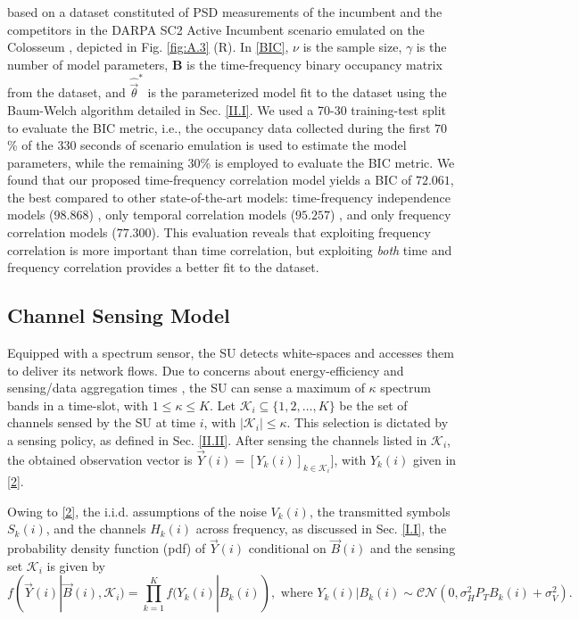 \documentclass[12pt, draftcls, onecolumn]{IEEEtran}
\begin{document}
based on a dataset constituted of PSD measurements of the incumbent and the competitors in the DARPA SC2 Active Incumbent scenario emulated on the Colosseum \cite{DARPA:SC2, DARPA:SC2c2api, DARPA:ActiveIncumbent, DARPA:SC2scenarios}, depicted in Fig. \ref{fig:A.3} (R). In \eqref{BIC}, $\nu$ is the sample size, $\gamma$ is the number of model parameters, $\mathbf{B}$ is the time-frequency binary occupancy matrix from the dataset, and $\hat{\vec{\theta}}^*$ is the parameterized model fit to the dataset using the Baum-Welch algorithm detailed in Sec. \ref{II.I}. We used a 70-30 training-test split to evaluate the BIC metric, i.e., the occupancy data collected during the first $70$\% of the $330$ seconds of scenario emulation is used to estimate the model parameters, while the remaining $30$\% is employed to evaluate the BIC metric. We found that our proposed time-frequency correlation model yields a BIC of $72.061$, the best compared to other state-of-the-art models: time-frequency independence models ($98.868$) \cite{WCL:4, WCL:10, WCL:9, WCL:11, WCL:8}, only temporal correlation models ($95.257$) \cite{WCL:5}, and only frequency correlation models ($77.300$). This evaluation reveals that exploiting frequency correlation is more important than time correlation, but exploiting \emph{both} time and frequency correlation provides a better fit to the dataset.

\subsection{Channel Sensing Model}\label{I.III}
Equipped with a spectrum sensor, the SU detects white-spaces and accesses them to deliver its network flows. Due to concerns about energy-efficiency and sensing/data aggregation times \cite{WCL:3}, the SU can sense a maximum of $\kappa$ spectrum bands in a time-slot, with $1{\leq}\kappa{\leq}K$. Let $\mathcal{K}_{i}{\subseteq}\{1,2,\dots,K\}$ be the set of channels sensed by the SU at time $i$, with $|\mathcal{K}_{i}|{\leq}\kappa$. This selection is dictated by a sensing policy, as defined in Sec. \ref{II.II}. After sensing the channels listed in $\mathcal{K}_{i}$, the obtained observation vector is $\vec{Y}(i){=}[Y_{k}(i)]_{k{\in}\mathcal{K}_{i}}]$, with  $Y_{k}(i)$ given in \eqref{2}.

Owing to \eqref{2}, the  i.i.d. assumptions of the noise $V_{k}(i)$, the transmitted symbols $S_{k}(i)$, and the channels $H_{k}(i)$ across frequency, as discussed in Sec. \ref{I.I}, the probability density function (pdf) of $\vec{Y}(i)$ conditional on $\vec{B}(i)$ and the sensing set $\mathcal{K}_{i}$ is given by
\begin{equation}\label{8}
    f(\vec{Y}(i)|\vec{B}(i),\mathcal{K}_{i})=\prod_{k=1}^{K}f(Y_{k}(i)|B_{k}(i)),\text{ where }
        Y_{k}(i)|B_{k}(i)\sim\mathcal{CN}(0,\sigma_{H}^{2}P_{T}B_{k}(i)+\sigma_{V}^{2}).
\end{equation}
\end{document}

